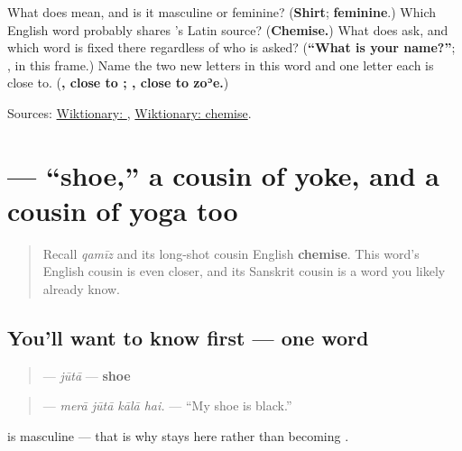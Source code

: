 \begin{tcolorbox}[breakable,colback=teal!4,colframe=teal!35!black,title={Before you move on}]
What does \textbf{} mean, and is it masculine or feminine? (\textbf{Shirt}; \textbf{feminine}.) Which English word probably shares \textbf{}'s Latin source? (\textbf{Chemise.}) What does \textbf{    } ask, and which word is fixed there regardless of who is asked? (\textbf{\textquotedblleft{}What is your name?\textquotedblright{}}; \textbf{}, in this frame.) Name the two new letters in this word and one letter each is close to. (\textbf{, close to ; , close to zoʾe.})

Sources: \href{https://en.wiktionary.org/wiki/\%D9\%82\%D9\%85\%DB\%8C\%D8\%B6}{Wiktionary: }, \href{https://en.wiktionary.org/wiki/chemise}{Wiktionary: chemise}.
\end{tcolorbox}
\section[\texorpdfstring{\ur{جوتا} (jūtā)}{جوتا (jūtā)}]{ — \textquotedblleft{}shoe,\textquotedblright{} a cousin of yoke, and a cousin of yoga too}

\label{lesson:UR-C14-juta}



\begin{quote}
Recall \emph{qamīz} and its long-shot cousin English \textbf{chemise}. This word's English cousin is even closer, and its Sanskrit cousin is a word you likely already know.
\end{quote}

\subsection*{You'll want to know first — one word}
\begin{quote}
\textbf{} — \emph{jūtā} — \textbf{shoe}
\end{quote}

\begin{quote}
\textbf{   } — \emph{merā jūtā kālā hai.} — \textquotedblleft{}My shoe is black.\textquotedblright{}
\end{quote}

\textbf{} is masculine — that is why \textbf{} stays \textbf{} here rather than becoming \textbf{}.

